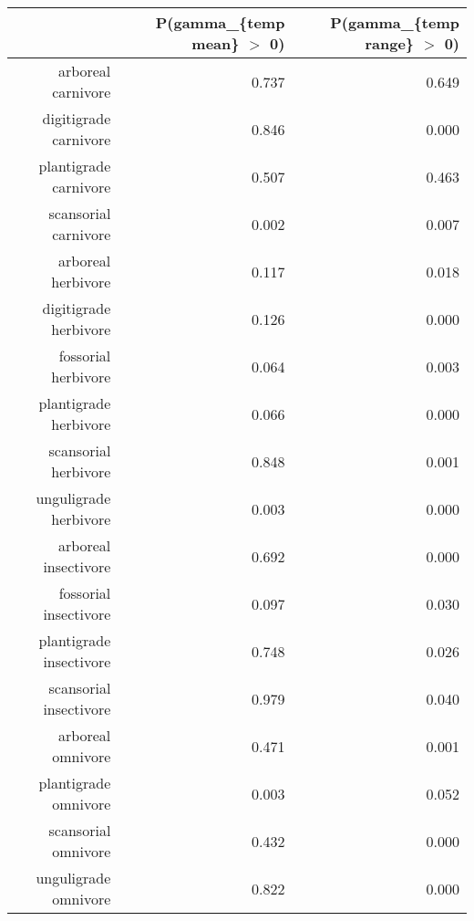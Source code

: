 \begin{table}[ht]
\centering
\begin{tabular}{rrr}
  \hline
 & P(gamma\_\{temp mean\} $>$ 0) & P(gamma\_\{temp range\} $>$ 0) \\ 
  \hline
arboreal carnivore & 0.737 & 0.649 \\ 
  digitigrade carnivore & 0.846 & 0.000 \\ 
  plantigrade carnivore & 0.507 & 0.463 \\ 
  scansorial carnivore & 0.002 & 0.007 \\ 
  arboreal herbivore & 0.117 & 0.018 \\ 
  digitigrade herbivore & 0.126 & 0.000 \\ 
  fossorial herbivore & 0.064 & 0.003 \\ 
  plantigrade herbivore & 0.066 & 0.000 \\ 
  scansorial herbivore & 0.848 & 0.001 \\ 
  unguligrade herbivore & 0.003 & 0.000 \\ 
  arboreal insectivore & 0.692 & 0.000 \\ 
  fossorial insectivore & 0.097 & 0.030 \\ 
  plantigrade insectivore & 0.748 & 0.026 \\ 
  scansorial insectivore & 0.979 & 0.040 \\ 
  arboreal omnivore & 0.471 & 0.001 \\ 
  plantigrade omnivore & 0.003 & 0.052 \\ 
  scansorial omnivore & 0.432 & 0.000 \\ 
  unguligrade omnivore & 0.822 & 0.000 \\ 
   \hline
\end{tabular}
\label{tab:origin_temp}
\end{table}
